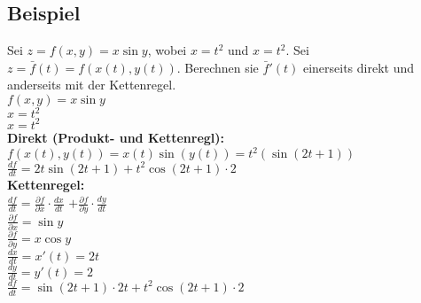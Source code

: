 \documentclass[../main.tex]{subfiles}
\begin{document}
\subsection{Beispiel}
Sei $z=f(x,y)=x\sin y$, wobei $x=t^2$ und $x=t^2$. Sei $z=\bar{f}(t)=f(x(t),y(t))$.
Berechnen sie $\bar{f}'(t)$ einerseits direkt und anderseits mit der Kettenregel. \\ [7pt]
$f(x,y)=x\sin y$ \\[7pt]
$x=t^2$\\[7pt]
$x=t^2$\\[7pt]
\textbf{Direkt (Produkt- und Kettenregl):}\\[7pt]
$f(x(t),y(t))=x(t)\sin(y(t)) = t^2(\sin(2t+1))$ \\ [7pt]
$\frac{df}{dt}=2t\sin(2t+1)+t^2\cos(2t+1)\cdot 2$ \\ [7pt]
\textbf{Kettenregel:}\\[7pt]
$\frac{df}{dt} = \frac{\partial f}{\partial x} \cdot \frac{dx}{dt}$
$+\frac{\partial f}{\partial y}\cdot\frac{dy}{dt}$ \\ [7pt]
$\frac{\partial f}{\partial x}=\sin y$ \\ [7pt] 
$\frac{\partial f}{\partial y}= x \cos y$ \\ [7pt]
$\frac{dx}{dt}=x'(t)=2t$ \\ [7pt]
$\frac{dy}{dt}=y'(t)=2$ \\ [7pt]
$\frac{df}{dt} = \sin(2t+1)\cdot 2t + t^2\cos(2t+1)\cdot 2$
\end{document}
